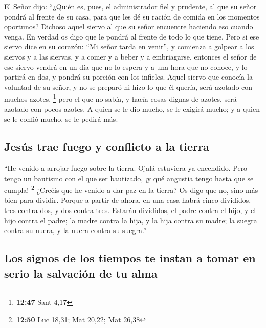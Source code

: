  El Señor dijo: ``¿Quién es, pues, el administrador fiel
y prudente, al que su señor pondrá al frente de su casa, para que les dé
su ración de comida en los momentos oportunos?  Dichoso
aquel siervo al que su señor encuentre haciendo eso cuando venga.
 En verdad os digo que le pondrá al frente de todo lo que
tiene.  Pero si ese siervo dice en su corazón: ``Mi señor
tarda en venir'', y comienza a golpear a los siervos y a las siervas, y
a comer y a beber y a embriagarse,  entonces el señor de
ese siervo vendrá en un día que no lo espera y a una hora que no conoce,
y lo partirá en dos, y pondrá su porción con los infieles.
 Aquel siervo que conocía la voluntad de su señor, y no
se preparó ni hizo lo que él quería, será azotado con muchos azotes,
\footnote{\textbf{12:47} Sant 4,17}  pero el que no
sabía, y hacía cosas dignas de azotes, será azotado con pocos azotes. A
quien se le dio mucho, se le exigirá mucho; y a quien se le confió
mucho, se le pedirá más.

\hypertarget{jesuxfas-trae-fuego-y-conflicto-a-la-tierra}{%
\subsection{Jesús trae fuego y conflicto a la
tierra}\label{jesuxfas-trae-fuego-y-conflicto-a-la-tierra}}

 ``He venido a arrojar fuego sobre la tierra. Ojalá
estuviera ya encendido.  Pero tengo un bautismo con el
que ser bautizado, ¡y qué angustia tengo hasta que se cumpla!
\footnote{\textbf{12:50} Luc 18,31; Mat 20,22; Mat 26,38}
 ¿Creéis que he venido a dar paz en la tierra? Os digo
que no, sino más bien para dividir.  Porque a partir de
ahora, en una casa habrá cinco divididos, tres contra dos, y dos contra
tres.  Estarán divididos, el padre contra el hijo, y el
hijo contra el padre; la madre contra la hija, y la hija contra su
madre; la suegra contra su nuera, y la nuera contra su suegra.''

\hypertarget{los-signos-de-los-tiempos-te-instan-a-tomar-en-serio-la-salvaciuxf3n-de-tu-alma}{%
\subsection{Los signos de los tiempos te instan a tomar en serio la
salvación de tu
alma}\label{los-signos-de-los-tiempos-te-instan-a-tomar-en-serio-la-salvaciuxf3n-de-tu-alma}}

